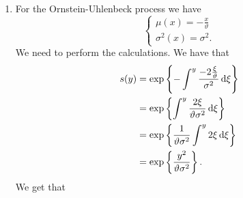 \documentclass[12pt]{article}
\begin{document}
\begin{enumerate}
\begin{itemize}
\begin{align*}
			&=e^{2\mu x}\left[\frac{c_{1}}{2\mu}\left(e^{-\mu x}-e^{-\mu a}\right)+c_{2}\right]\\
			&=\frac{c_{1}}{2\mu}\left(e^{2\mu x}e^{-2\mu x}-e^{2\mu x}e^{2\mu a}\right)+c_{2}e^{2\mu x}\\
			&=\frac{c_{1}}{2\mu}\left(1-e^{2\mu(x-a)}\right) +c_{2}e^{2\mu x}.
		\end{align*}
		As before, we try setting $c_1=0$ so that the equilibrium distribution becomes
		\begin{equation*}
			\psi(x)=c_2e^{2\mu x}
		\end{equation*}
		and so that the normalization condition becomes
		\begin{align*}
			\int_{a}^{b}\psi(x)\dx=\int_{a}^{b}c_{2}e^{2\mu x}\dx=1.
		\end{align*}
		So we get
		\begin{align*}
			c_2\int_{a}^{b}e^{2\mu x}\dx&=\frac{c_2}{2\mu}\left(e^{2\mu b}-e^{2\mu a}\right)=1 \qquad\text{this is okay because }\mu\neq0\\
			\implies&c_2=\frac{2\mu}{e^{2\mu b}-e^{2\mu a}}.
		\end{align*}
		This gives us
		\begin{equation*}
			\psi(x)=\frac{2\mu\cdot e^{2\mu x}}{e^{2\mu b}-e^{2\mu a}},\qquad x\in[a,b],\mu \neq0
		\end{equation*}
		which is a truncated exponential distribution with parameter $\lambda=-2\mu$.
	\end{itemize}
	\item For the Ornstein-Uhlenbeck process we have
	\begin{equation*}
		\begin{cases}
			\mu(x)=-\frac{x}{\vartheta}\\
			\sigma^{2}(x)=\sigma^{2}.	\end{cases}
	\end{equation*}
	We need to perform the calculations. We have that
	\begin{align*}
		s(y)&=\exp\left\{-\int^{y}\frac{-2\frac{\xi}{\vartheta}}{\sigma^{2}}\mathop{}\!\mathrm{d}\xi\right\}\\
		&=\exp\left\{\int^{y}\frac{2\xi}{\vartheta\sigma^{2}}\mathop{}\!\mathrm{d}\xi\right\}\\
		&=\exp\left\{\frac{1}{\vartheta\sigma^{2}}\int^{y}2\xi\mathop{}\!\mathrm{d}\xi\right\}\\
		&=\exp\left\{\frac{y^{2}}{\vartheta\sigma^{2}}\right\}.
	\end{align*}
	We get that
	\begin{equation*}

\end{equation*}
\end{enumerate}
\end{document}
